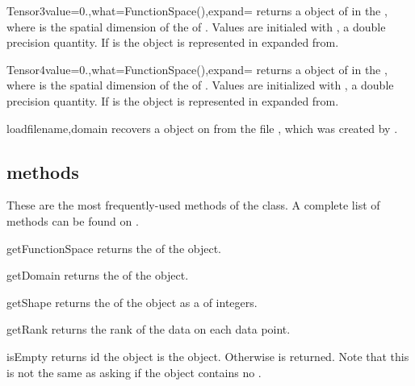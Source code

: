\begin{funcdesc}{Tensor3}{value=0.,what=FunctionSpace(),expand=\False}
returns a \Data object of \Shape {} in the \FunctionSpace {},
where  is the spatial dimension of the \Domain of .
Values are initialed with , a double precision quantity. If  is \True
the \Data object is represented in expanded from.
\end{funcdesc}

\begin{funcdesc}{Tensor4}{value=0.,what=FunctionSpace(),expand=\False}
returns a \Data object of \Shape {} in the \FunctionSpace {},
where  is the spatial dimension of the \Domain of .
Values are initialized with , a double precision quantity. If  is \True
the \Data object is represented in expanded from.
\end{funcdesc}

\begin{funcdesc}{load}{filename,domain}
recovers a \Data object on \Domain {} from the file , which was created by .
\end{funcdesc}

\subsection{\Data methods}
These are the most frequently-used methods of the 
\Data class. A complete list of methods can be found on \ReferenceGuide.
\begin{methoddesc}[Data]{getFunctionSpace}{}
returns the \FunctionSpace of the object.
\end{methoddesc}

\begin{methoddesc}[Data]{getDomain}{}
returns the \Domain  of the object.
\end{methoddesc}

\begin{methoddesc}[Data]{getShape}{}
returns the \Shape  of the object as a  of
integers.
\end{methoddesc}

\begin{methoddesc}[Data]{getRank}{}
returns the rank of the data on each data point. 
\end{methoddesc}

\begin{methoddesc}[Data]{isEmpty}{}
returns \True id the \Data object is the \EmptyData object.
Otherwise \False is returned.
Note that this is not the same as asking if the object contains no \DataSamplePoints.
\end{methoddesc}

